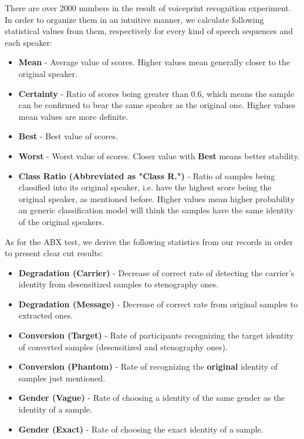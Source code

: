\documentclass[conference]{IEEEtran}
\begin{document}
There are over 2000 numbers in the result of voiceprint recognition experiment. In order to organize them in an intuitive manner, we calculate following statistical values from them, respectively for every kind of speech sequences and each speaker:

\begin{itemize}
    \item \textbf{Mean} - Average value of scores. Higher values mean generally closer to the original speaker.
    \item \textbf{Certainty} - Ratio of scores being greater than 0.6, which means the sample can be confirmed to bear the same speaker as the original one. Higher values mean values are more definite.
    \item \textbf{Best} - Best value of scores.
    \item \textbf{Worst} - Worst value of scores. Closer value with \textbf{Best} means better stability.
    \item \textbf{Class Ratio (Abbreviated as "Class R.")} - Ratio of samples being classified into its original speaker, i.e. have the highest score being the original speaker, as mentioned before. Higher values mean higher probability an generic classification model will think the samples have the same identity of the original speakers.
\end{itemize}

As for the ABX test, we derive the following statistics from our records in order to present clear cut results:

\begin{itemize}
    \item \textbf{Degradation (Carrier)} - Decrease of correct rate of detecting the carrier's identity from desensitized samples to stenography ones.
    \item \textbf{Degradation (Message)} - Decrease of correct rate from original samples to extracted ones.
    \item \textbf{Conversion (Target)} - Rate of participants recognizing the target identity of converted samples (desensitized and stenography ones).
    \item \textbf{Conversion (Phantom)} - Rate of recognizing the \textbf{original} identity of samples just mentioned.
    \item \textbf{Gender (Vague)} - Rate of choosing a identity of the same gender as the identity of a sample.
    \item \textbf{Gender (Exact)} - Rate of choosing the exact identity of a sample.
\end{itemize}
\end{document}
